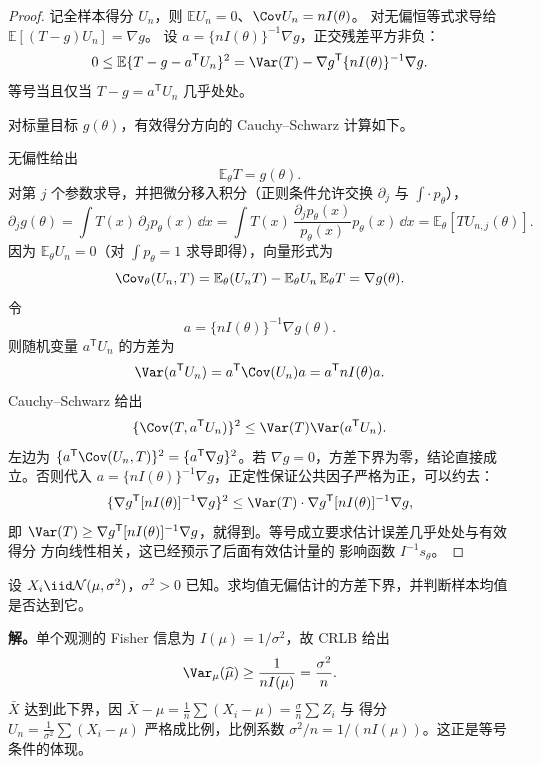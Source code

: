 \begin{proof}
记全样本得分 $U_n$，则 $\mathbb E U_n=0$、$\Cov U_n=nI(\theta)$。
对无偏恒等式求导给 $\mathbb E[(T-g)U_n]=\nabla g$。
设 $a=\{nI(\theta)\}^{-1}\nabla g$，正交残差平方非负：
\[
 0\le\mathbb E\{T-g-a^{\mathsf T}U_n\}^2
 =\Var(T)-\nabla g^{\mathsf T}\{nI(\theta)\}^{-1}\nabla g.
\]
等号当且仅当 $T-g=a^{\mathsf T}U_n$ 几乎处处。

对标量目标 $g(\theta)$，有效得分方向的 Cauchy--Schwarz 计算如下。

无偏性给出
\[
 \mathbb E_\theta T=g(\theta).
\]
对第 $j$ 个参数求导，并把微分移入积分（正则条件允许交换 $\partial_j$ 与 $\int\cdot\,p_\theta$），
\[
 \partial_j g(\theta)
 =\int T(x)\,\partial_j p_\theta(x)\,\dd x
 =\int T(x)\,\frac{\partial_j p_\theta(x)}{p_\theta(x)}p_\theta(x)\,\dd x
 =\mathbb E_\theta[TU_{n,j}(\theta)].
\]
因为 $\mathbb E_\theta U_n=0$（对 $\int p_\theta=1$ 求导即得），向量形式为
\[
 \Cov_\theta(U_n,T)
 =\mathbb E_\theta(U_n T)-\mathbb E_\theta U_n\,\mathbb E_\theta T
 =\nabla g(\theta).
\]
令
\[
 a=\{nI(\theta)\}^{-1}\nabla g(\theta).
\]
则随机变量 $a^{\mathsf T}U_n$ 的方差为
\[
 \Var(a^{\mathsf T}U_n)
 =a^{\mathsf T}\Cov(U_n)a
 =a^{\mathsf T}nI(\theta)a.
\]
Cauchy--Schwarz 给出
\[
 \{\Cov(T,a^{\mathsf T}U_n)\}^2
 \le\Var(T)\Var(a^{\mathsf T}U_n).
\]
左边为 $\{a^{\mathsf T}\Cov(U_n,T)\}^2=\{a^{\mathsf T}\nabla g\}^2$。若 $\nabla g=0$，方差下界为零，结论直接成立。否则代入 $a=\{nI(\theta)\}^{-1}\nabla g$，正定性保证公共因子严格为正，可以约去：
\[
\{\nabla g^{\mathsf T}[nI(\theta)]^{-1}\nabla g\}^2
\le\Var(T)\cdot\nabla g^{\mathsf T}[nI(\theta)]^{-1}\nabla g,
\]
即 $\Var(T)\ge\nabla g^{\mathsf T}[nI(\theta)]^{-1}\nabla g$，就得到。等号成立要求估计误差几乎处处与有效 得分 方向线性相关，这已经预示了后面有效估计量的 影响函数 $I^{-1}s_\theta$。
\end{proof}

\begin{workedexample}[正态均值达到有限样本界]
设 $X_i\iid\mathcal N(\mu,\sigma^2)$，$\sigma^2>0$ 已知。求均值无偏估计的方差下界，并判断样本均值是否达到它。

\textbf{解。}单个观测的 Fisher 信息为 $I(\mu)=1/\sigma^2$，故 CRLB 给出
\[
\Var_\mu(\widehat\mu)\ge\frac{1}{nI(\mu)}=\frac{\sigma^2}{n}.
\]
$\bar X$ 达到此下界，因 $\bar X-\mu=\frac1n\sum(X_i-\mu)=\frac{\sigma}{n}\sum Z_i$ 与 得分 $U_n=\frac1{\sigma^2}\sum(X_i-\mu)$ 严格成比例，比例系数 $\sigma^2/n=1/(nI(\mu))$。这正是等号条件的体现。
\end{workedexample}

